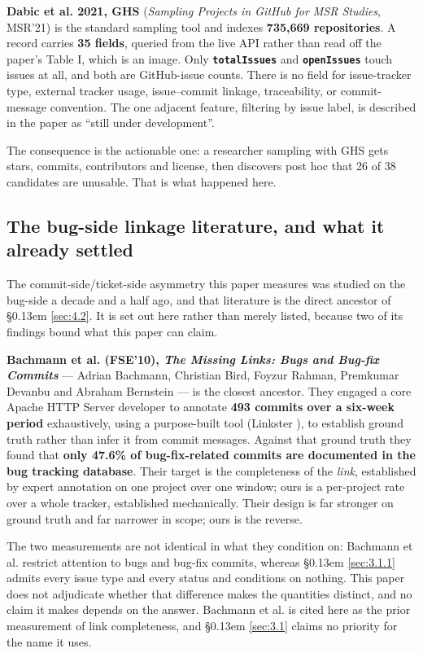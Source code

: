 \documentclass[11pt,a4paper]{article}
\begin{document}
\textbf{Dabic et al. 2021, GHS} \cite{dabic2021sampling} (\emph{Sampling Projects in GitHub for MSR Studies}, MSR'21) is the standard sampling tool and indexes \textbf{735,669 repositories}. A record carries \textbf{35 fields}, queried from the live API rather than read off the paper's Table I, which is an image. Only \textbf{\texttt{totalIssues}} and \textbf{\texttt{openIssues}} touch issues at all, and both are GitHub-issue counts. There is no field for issue-tracker type, external tracker usage, issue--commit linkage, traceability, or commit-message convention. The one adjacent feature, filtering by issue label, is described in the paper as ``still under development''.

The consequence is the actionable one: a researcher sampling with GHS gets stars, commits, contributors and license, then discovers post hoc that 26 of 38 candidates are unusable. That is what happened here.

\subsection{The bug-side linkage literature, and what it already settled}
\label{sec:2.4}

The commit-side/ticket-side asymmetry this paper measures was studied on the bug-side a decade and a half ago, and that literature is the direct ancestor of \S\kern0.13em \ref{sec:4.2}. It is set out here rather than merely listed, because two of its findings bound what this paper can claim.

\textbf{Bachmann et al. (FSE'10), \emph{The Missing Links: Bugs and Bug-fix Commits}} \cite{bachmann2010missing} --- Adrian Bachmann, Christian Bird, Foyzur Rahman, Premkumar Devanbu and Abraham Bernstein --- is the closest ancestor. They engaged a core Apache HTTP Server developer to annotate \textbf{493 commits over a six-week period} exhaustively, using a purpose-built tool (Linkster \cite{bird2010linkster}), to establish ground truth rather than infer it from commit messages. Against that ground truth they found that \textbf{only 47.6\% of bug-fix-related commits are documented in the bug tracking database}. Their target is the completeness of the \emph{link}, established by expert annotation on one project over one window; ours is a per-project rate over a whole tracker, established mechanically. Their design is far stronger on ground truth and far narrower in scope; ours is the reverse.

The two measurements are not identical in what they condition on: Bachmann et al. restrict attention to bugs and bug-fix commits, whereas \S\kern0.13em \ref{sec:3.1.1} admits every issue type and every status and conditions on nothing. This paper does not adjudicate whether that difference makes the quantities distinct, and no claim it makes depends on the answer. Bachmann et al. is cited here as the prior measurement of link completeness, and \S\kern0.13em \ref{sec:3.1} claims no priority for the name it uses.
\end{document}
